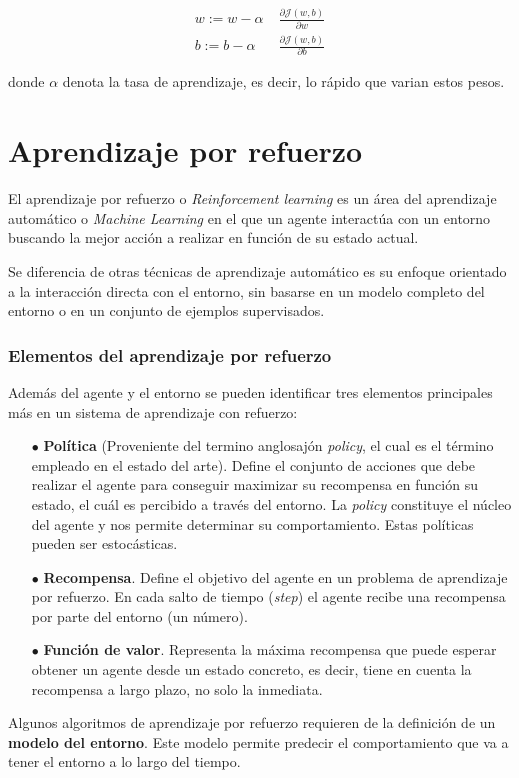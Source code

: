  \begin{align}
 	w:= w - \alpha\; &\frac{\partial\mathcal{J}(w,b)}{\partial w}\\
 	b:= b - \alpha\; &\frac{\partial\mathcal{J}(w,b)}{\partial b}
 \end{align}
 
 donde $\alpha$ denota la tasa de aprendizaje, es decir, lo rápido que varian estos pesos.

 



\section{Aprendizaje por refuerzo}

El aprendizaje por refuerzo o \textit{Reinforcement learning} \cite{sutton2018reinforcement} es un área del aprendizaje automático o \textit{Machine Learning} en el que un agente interactúa con un entorno buscando la mejor acción a realizar en función de su estado actual.

Se diferencia de otras técnicas de aprendizaje automático es su enfoque orientado a la interacción directa con el entorno, sin basarse en un modelo completo del entorno o en un conjunto de ejemplos supervisados.

\subsubsection{Elementos del aprendizaje por refuerzo}
Además del agente y el entorno se pueden identificar tres elementos principales más en un sistema de aprendizaje con refuerzo:

\begin{itemize}
	\item[$\bullet$] \textbf{Política} (Proveniente del termino anglosajón \textit{policy}, el cual es el término empleado en el estado del arte). Define el conjunto de acciones que debe realizar el agente para conseguir maximizar su recompensa en función su estado, el cuál es percibido a través del entorno. La \textit{policy} constituye el núcleo del agente y nos permite determinar su comportamiento. Estas políticas pueden ser estocásticas.
	
	\item[$\bullet$] \textbf{Recompensa}. 
	Define el objetivo del agente en un problema de aprendizaje por refuerzo. En cada salto de tiempo (\textit{step}) el agente recibe una recompensa por parte del entorno (un número). 
	
	\item[$\bullet$] \textbf{Función de valor}. Representa la máxima recompensa que puede esperar obtener un agente desde un estado concreto, es decir, tiene en cuenta la recompensa a largo plazo, no solo la inmediata. 
		
\end{itemize}
Algunos algoritmos de aprendizaje por refuerzo requieren de la definición de un \textbf{modelo del entorno}. Este modelo permite predecir el comportamiento que va a tener el entorno a lo largo del tiempo.

